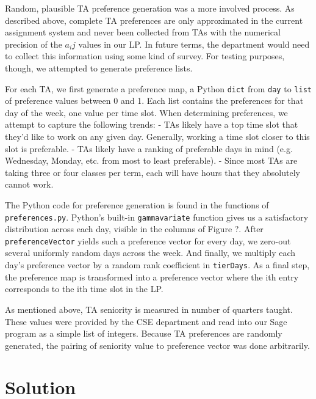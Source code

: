 \documentclass{article}
\begin{document}
\begin{multicols}{2}
Random, plausible TA preference generation was a more involved process. As described above, complete TA preferences are only approximated in the current assignment system and never been collected from TAs with the numerical precision of the $a_ij$ values in our LP. In future terms, the department would need to collect this information using some kind of survey. For testing purposes, though, we attempted to generate preference lists.

For each TA, we first generate a preference map, a Python \texttt{dict} from \texttt{day} to \texttt{list} of preference values between 0 and 1. Each list contains the preferences for that day of the week, one value per time slot. When determining preferences, we attempt to capture the following trends:
- TAs likely have a top time slot that they'd like to work on any given day. Generally, working a time slot closer to this slot is preferable.
- TAs likely have a ranking of preferable days in mind (e.g. Wednesday, Monday, etc. from most to least preferable).
- Since most TAs are taking three or four classes per term, each will have hours that they absolutely cannot work.

The Python code for preference generation is found in the functions of \texttt{preferences.py}. Python's built-in \texttt{gammavariate} function gives us a satisfactory distribution across each day, visible in the columns of Figure ?. After \texttt{preferenceVector} yields such a preference vector for every day, we zero-out several uniformly random days across the week. And finally, we multiply each day's preference vector by a random rank coefficient in \texttt{tierDays}. As a final step, the preference map is transformed into a preference vector where the ith entry corresponds to the ith time slot in the LP.

As mentioned above, TA seniority is measured in number of quarters taught. These values were provided by the CSE department and read into our Sage program as a simple list of integers. Because TA preferences are randomly generated, the pairing of seniority value to preference vector was done arbitrarily.

\section*{Solution}


\end{multicols}
\end{document}
